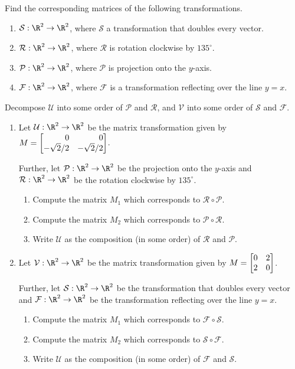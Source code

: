 \begin{exercises}
	\begin{problist}
	    \prob Find the corresponding matrices of the following transformations.
    	    \begin{enumerate}
    	        \item $\mathcal S:\R^2\to\R^2$, where $\mathcal S$ a transformation that doubles every vector.
    	        \item $\mathcal R:\R^2\to\R^2$, where $\mathcal R$ is rotation clockwise by $135^\circ$.
    	        \item $\mathcal P:\R^2\to\R^2$, where $\mathcal P$ is projection onto the $y$-axis.
    	        \item $\mathcal F:\R^2\to\R^2$, where $\mathcal F$ is a transformation reflecting over the line $y=x$.
    	    \end{enumerate}
	    \prob Decompose $\mathcal U$ into some order of $\mathcal P$ and $\mathcal R$, and $\mathcal V$ into some order of $\mathcal S$ and $\mathcal F$.  
	    \begin{enumerate}
	        \item Let $\mathcal U:\R^2\to\R^2$ be the matrix transformation given by $M=\mat{0&0\\-\sqrt{2}/2 & -\sqrt{2}/2}$. 
	        
	        Further, let $\mathcal P:\R^2\to\R^2$ be the projection onto the $y$-axis
	        and $\mathcal R:\R^2\to\R^2$ be the rotation clockwise by $135^\circ$.
        	    \begin{enumerate}
        			\item   Compute the matrix $M_1$ which corresponds to $\mathcal R \circ \mathcal P$.
        			\item   Compute the matrix $M_2$ which corresponds to $\mathcal P \circ \mathcal R$.
        			\item   Write $\mathcal U$ as the composition (in some order) of $\mathcal R$ and $\mathcal P$.
        		\end{enumerate}
        		
        	\item Let $\mathcal V:\R^2\to\R^2$ be the matrix transformation given by $M=\mat{0&2\\2&0}$.
		
		    Further, let $\mathcal S:\R^2\to\R^2$ be the transformation that doubles every vector
		    and $\mathcal F:\R^2\to\R^2$ be the transformation reflecting over the line $y=x$.
                		\begin{enumerate}
                			\item   Compute the matrix $M_1$ which corresponds to $\mathcal F \circ \mathcal S$.
                			\item   Compute the matrix $M_2$ which corresponds to $\mathcal S \circ \mathcal F$.
                			\item   Write $\mathcal U$ as the composition (in some order) of $\mathcal F$ and $\mathcal S$.
                		\end{enumerate}
	    \end{enumerate}
	

\end{problist}
\end{exercises}
